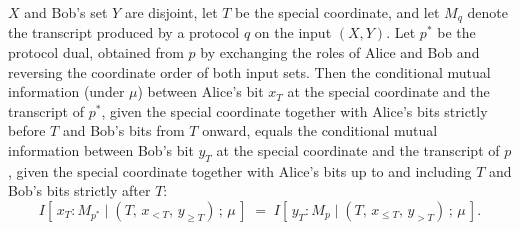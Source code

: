 \begin{theorem}
$X$ and Bob's set $Y$ are disjoint, let $T$ be the special coordinate, and let $M_q$
denote the transcript produced by a protocol $q$ on the input $(X, Y)$. Let $p^\ast$ be
the protocol dual, obtained from $p$ by exchanging the roles of Alice and Bob and
reversing the coordinate order of both input sets. Then the conditional mutual
information (under $\mu$) between Alice's bit $x_T$ at the special coordinate and the
transcript of $p^\ast$, given the special coordinate together with Alice's bits strictly
before $T$ and Bob's bits from $T$ onward, equals the conditional mutual information
between Bob's bit $y_T$ at the special coordinate and the transcript of $p$, given the
special coordinate together with Alice's bits up to and including $T$ and Bob's bits
strictly after $T$:
\[
I\!\left[\,x_T : M_{p^\ast} \mid (T,\, x_{<T},\, y_{\ge T})\,;\, \mu\,\right]
\;=\;
I\!\left[\,y_T : M_{p} \mid (T,\, x_{\le T},\, y_{>T})\,;\, \mu\,\right].
\]
\end{theorem}

